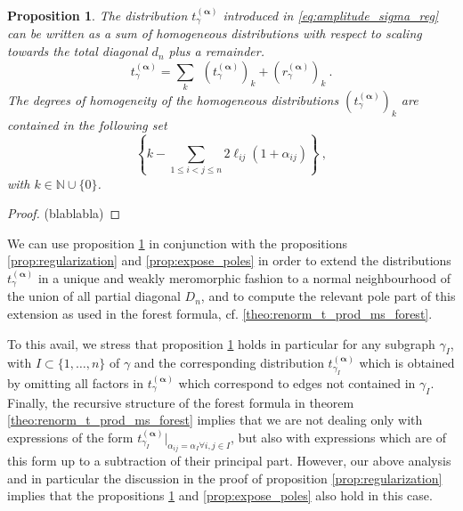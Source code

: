\documentclass[12pt]{book}
\theoremstyle{break}
\newtheorem{proposition}{Proposition}
\begin{document}
\begin{proposition}\label{prop:almost_homo}
The distribution $t_\gamma^{(\boldsymbol{\alpha})}$ introduced in \eqref{eq:amplitude_sigma_reg} can be written as a sum of homogeneous distributions with respect to scaling towards the total diagonal $d_n$ plus a remainder. 
%
\begin{equation*}
t_\gamma^{(\boldsymbol{\alpha})} = \sum_k \ \ \left( t_\gamma^{(\boldsymbol{\alpha})} \right)_k + \left(r_\gamma^{(\boldsymbol{\alpha})}\right)_k \ .
\end{equation*}
%
The degrees of homogeneity of the homogeneous distributions $\left( t_\gamma^{(\boldsymbol{\alpha})} \right)_k$ are contained in the following set
%
\begin{equation*}
\left\{k-\sum_{1\leq i<j\leq n} 2 \ell_{ij}(1+ \alpha_{ij}) \right\} \ ,
\end{equation*}
%
with $k\in \mathbb{N}\cup \{0\}$.
\end{proposition}


\begin{proof}
(blablabla)
\end{proof}


We can use proposition \ref{prop:almost_homo} in conjunction with the propositions \ref{prop:regularization} and \ref{prop:expose_poles} in order to extend the distributions $t_\gamma^{(\boldsymbol{\alpha})}$ in a unique and weakly meromorphic fashion to a normal neighbourhood of the union of all partial diagonal $D_n$, and to compute the relevant pole part of this extension as used in the forest formula, cf. \ref{theo:renorm_t_prod_ms_forest}. 


To this avail, we stress that proposition \ref{prop:almost_homo} holds in particular for any subgraph $\gamma_I$, with $I\subset\{1,\dots,n\}$ of $\gamma$ and the corresponding distribution $t_{\gamma_I}^{(\boldsymbol{\alpha})}$ which is obtained by omitting all factors in $t_{\gamma}^{(\boldsymbol{\alpha})}$ which correspond to edges not contained in $\gamma_I$. Finally, the recursive structure of the forest formula in theorem \ref{theo:renorm_t_prod_ms_forest} implies that we are not dealing only with 
expressions of the form $t_{\gamma_I}^{(\boldsymbol{\alpha})}|_{\alpha_{ij}=\alpha_I \forall i,j\in I}$, but also with expressions which are of this form up to a subtraction of their principal part. However, our above analysis and in particular the discussion in the proof of proposition \ref{prop:regularization} implies that the propositions \ref{prop:almost_homo} 
and \ref{prop:expose_poles} also hold in this case.
\end{document}
